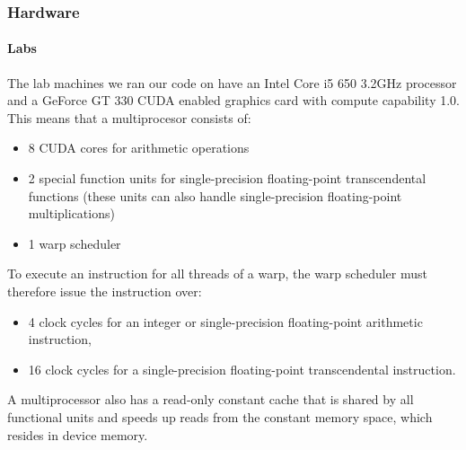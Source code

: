 \subsubsection*{Hardware}
\paragraph{Labs}
  The lab machines we ran our code on have an Intel Core i5 650 3.2GHz processor and a  GeForce GT 330 CUDA enabled graphics card with compute capability 1.0. This means that a multiprocesor consists of\cite{compute_1.0}:
  \begin{itemize}
    \item 8 CUDA cores for arithmetic operations
    \item 2 special function units for single-precision floating-point transcendental functions (these units can also handle single-precision floating-point multiplications)
    \item 1 warp scheduler
  \end{itemize}
  To execute an instruction for all threads of a warp, the warp scheduler must therefore issue the instruction over:
  \begin{itemize}
    \item 4 clock cycles for an integer or single-precision floating-point arithmetic instruction,
    \item 16 clock cycles for a single-precision floating-point transcendental instruction.
  \end{itemize}
  A multiprocessor also has a read-only constant cache that is shared by all functional units and speeds up reads from the constant memory space, which resides in device memory.